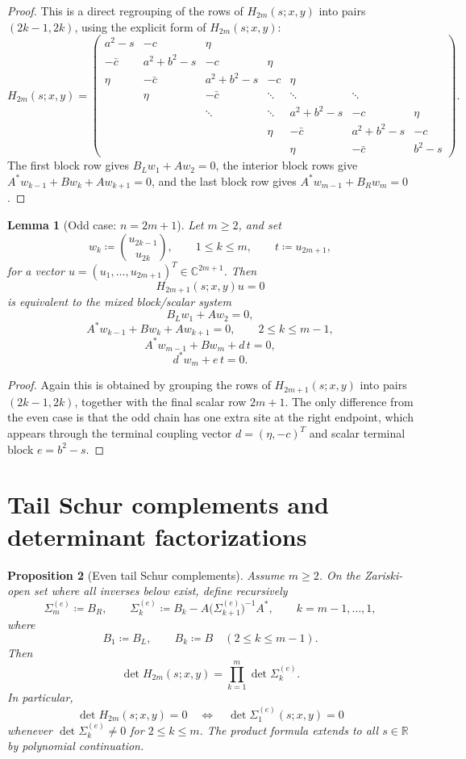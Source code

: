 \documentclass[11pt]{article}
\newtheorem{lemma}{Lemma}[section]
\newtheorem{proposition}[lemma]{Proposition}
\newcommand{\C}{\mathbb C}
\newcommand{\R}{\mathbb R}
\begin{document}
\begin{proof}
This is a direct regrouping of the rows of \(H_{2m}(s;x,y)\) into pairs
\((2k-1,2k)\), using the explicit form of \(H_{2m}(s;x,y)\):
\[
H_{2m}(s;x,y)=
\begin{pmatrix}
a^2-s & -c & \eta \\
-\bar c & a^2+b^2-s & -c & \eta \\
\eta & -\bar c & a^2+b^2-s & -c & \eta \\
& \eta & -\bar c & \ddots & \ddots & \ddots \\
&& \ddots & \ddots & a^2+b^2-s & -c & \eta \\
&&& \eta & -\bar c & a^2+b^2-s & -c \\
&&&& \eta & -\bar c & b^2-s
\end{pmatrix}.
\]
The first block row gives \(B_L w_1+A w_2=0\), the interior block rows give
\(A^*w_{k-1}+Bw_k+Aw_{k+1}=0\), and the last block row gives
\(A^*w_{m-1}+B_Rw_m=0\).
\end{proof}

\begin{lemma}[Odd case: \(n=2m+1\)]\label{lem:odd-block}
Let \(m\ge 2\), and set
\[
w_k\coloneqq \binom{u_{2k-1}}{u_{2k}},
\qquad
1\le k\le m,
\qquad
t\coloneqq u_{2m+1},
\]
for a vector \(u=(u_1,\dots,u_{2m+1})^T\in\C^{2m+1}\). Then
\[
H_{2m+1}(s;x,y)u=0
\]
is equivalent to the mixed block/scalar system
\[
B_L w_1 + A w_2 = 0,
\]
\[
A^* w_{k-1} + B w_k + A w_{k+1} = 0,
\qquad
2\le k\le m-1,
\]
\[
A^* w_{m-1} + B w_m + d\,t = 0,
\]
\[
d^* w_m + e\,t = 0.
\]
\end{lemma}

\begin{proof}
Again this is obtained by grouping the rows of \(H_{2m+1}(s;x,y)\) into pairs
\((2k-1,2k)\), together with the final scalar row \(2m+1\). The only difference
from the even case is that the odd chain has one extra site at the right endpoint,
which appears through the terminal coupling vector \(d=(\eta,-c)^T\) and scalar
terminal block \(e=b^2-s\).
\end{proof}

\section{Tail Schur complements and determinant factorizations}

\begin{proposition}[Even tail Schur complements]\label{prop:even-schur}
Assume \(m\ge 2\). On the Zariski-open set where all inverses below exist, define
recursively
\[
\Sigma_m^{(e)}\coloneqq B_R,
\qquad
\Sigma_k^{(e)}\coloneqq B_k-A\bigl(\Sigma_{k+1}^{(e)}\bigr)^{-1}A^*,
\qquad
k=m-1,\dots,1,
\]
where
\[
B_1\coloneqq B_L,
\qquad
B_k\coloneqq B
\quad (2\le k\le m-1).
\]
Then
\[
\det H_{2m}(s;x,y)=\prod_{k=1}^m \det \Sigma_k^{(e)}.
\]
In particular,
\[
\det H_{2m}(s;x,y)=0
\quad\Longleftrightarrow\quad
\det \Sigma_1^{(e)}(s;x,y)=0
\]
whenever \(\det \Sigma_k^{(e)}\neq 0\) for \(2\le k\le m\). The product formula
extends to all \(s\in\R\) by polynomial continuation.
\end{proposition}
\end{document}

